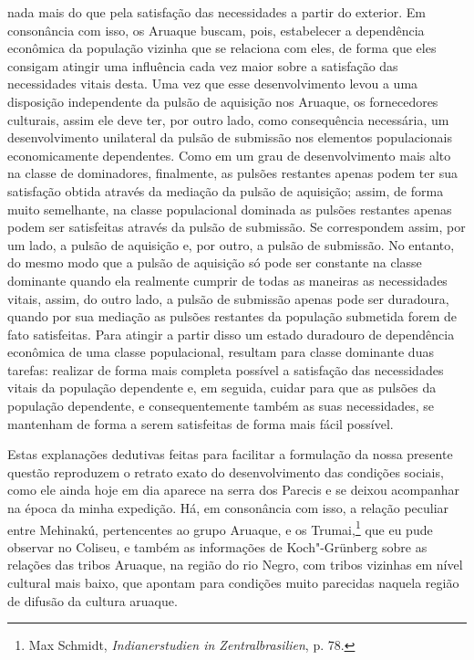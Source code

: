 nada mais do que pela satisfação das necessidades a partir do exterior.
Em consonância com isso, os Aruaque buscam, pois, estabelecer a
dependência econômica da população vizinha que se relaciona com eles, de
forma que eles consigam atingir uma influência cada vez maior sobre a
satisfação das necessidades vitais desta. Uma vez que esse
desenvolvimento levou a uma disposição independente da pulsão de
aquisição nos Aruaque, os fornecedores culturais, assim ele deve ter,
por outro lado, como consequência necessária, um desenvolvimento
unilateral da pulsão de submissão nos elementos populacionais
economicamente dependentes. Como em um grau de desenvolvimento mais alto
na classe de dominadores, finalmente, as pulsões restantes apenas podem
ter sua satisfação obtida através da mediação da pulsão de aquisição;
assim, de forma muito semelhante, na classe populacional dominada as
pulsões restantes apenas podem ser satisfeitas através da pulsão de
submissão. Se correspondem assim, por um lado, a pulsão de aquisição e,
por outro, a pulsão de submissão. No entanto, do mesmo modo que a pulsão
de aquisição só pode ser constante na classe dominante quando ela
realmente cumprir de todas as maneiras as necessidades vitais, assim, do
outro lado, a pulsão de submissão apenas pode ser duradoura, quando por
sua mediação as pulsões restantes da população submetida forem de fato
satisfeitas. Para atingir a partir disso um estado duradouro de
dependência econômica de uma classe populacional, resultam para classe
dominante duas tarefas: realizar de forma mais completa possível a
satisfação das necessidades vitais da população dependente e, em
seguida, cuidar para que as pulsões da população dependente, e
consequentemente também as suas necessidades, se mantenham de forma a
serem satisfeitas de forma mais fácil possível.

Estas explanações dedutivas feitas para facilitar a formulação da nossa
presente questão reproduzem o retrato exato do desenvolvimento das
condições sociais, como ele ainda hoje em dia aparece na serra dos
Parecis e se deixou acompanhar na época da minha expedição. Há, em
consonância com isso, a relação peculiar entre Mehinakú, pertencentes ao
grupo Aruaque, e os Trumai,\footnote{Max Schmidt, \emph{Indianerstudien
  in Zentralbrasilien}, p. 78.} que eu pude observar no Coliseu, e
também as informações de Koch"-Grünberg sobre as relações das tribos
Aruaque, na região do rio Negro, com tribos vizinhas em nível cultural
mais baixo, que apontam para condições muito parecidas naquela região
de difusão da cultura aruaque.

